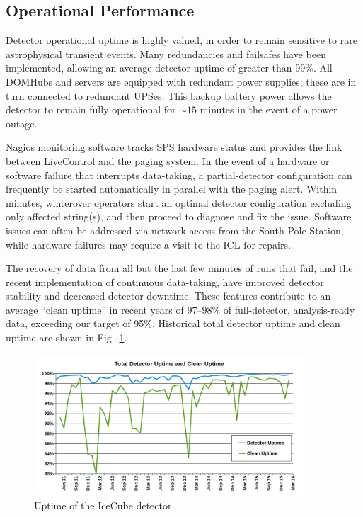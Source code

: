 \subsection{\label{sec:operational_performance} Operational Performance}

Detector operational uptime is highly valued, in order to remain
sensitive to rare astrophysical transient events.  Many redundancies and
failsafes have been implemented, allowing an average detector uptime of greater
than 99\%.  All DOMHubs and servers are equipped with redundant power
supplies; these are in turn connected to redundant UPSes.   This backup battery
power allows the detector to remain fully operational for $\sim15$ minutes in the
event of a power outage.

Nagios monitoring software tracks SPS hardware status and provides the link
between LiveControl and the paging system.  In the event of a hardware
or software failure that interrupts data-taking, a partial-detector configuration can
frequently be started automatically in parallel with the paging alert.
Within minutes, winterover operators start an optimal detector configuration
excluding only affected string(s), and then proceed to diagnose and fix the
issue.  Software issues can often be addressed via network access from the
South Pole Station, while hardware failures may require a visit to the ICL
for repairs.

The recovery of data from all but the last few minutes of runs that fail,
and the recent implementation of continuous data-taking, have improved
detector stability and decreased detector downtime. These features
contribute to an average “clean uptime” in recent years of 97--98\% of
full-detector, analysis-ready data, exceeding our target of 95\%.
Historical total detector uptime and clean uptime are shown in
Fig.~\ref{fig:clean-uptime}.   

\begin{figure}[!ht]
 \centering
 \includegraphics[width=0.9\textwidth]{graphics/uptime/clean-uptime.png}
 \caption{Uptime of the IceCube detector.}
 \label{fig:clean-uptime}
\end{figure}

